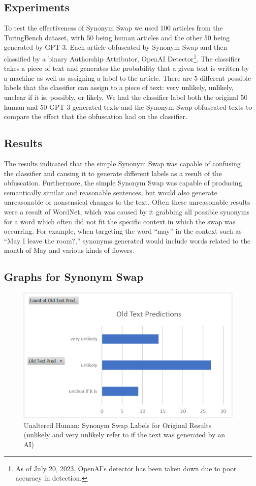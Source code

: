 \documentclass{article}
\begin{document}
\subsection{Experiments}
To test the effectiveness of Synonym Swap we used 100 articles from the TuringBench dataset, with 50 being human articles and the other 50 being generated by GPT-3. Each article obfuscated by Synonym Swap and then classified by a binary Authorship Attributor, OpenAI Detector\footnote{As of July 20, 2023, OpenAI's detector has been taken down due to poor accuracy in detection.}. The classifier takes a piece of text and generates the probability that a given text is written by a machine as well as assigning a label to the article. There are 5 different possible labels that the classifier can assign to a piece of text: very unlikely, unlikely, unclear if it is, possibly, or likely.
We had the classifier label both the original 50 human and 50 GPT-3 generated texts and the Synonym Swap obfuscated texts to compare the effect that the obfuscation had on the classifier.
\subsection{Results}
The results indicated that the simple Synonym Swap was capable of confusing the classifier and causing it to generate different labels as a result of the obfuscation.
Furthermore, the simple Synonym Swap was capable of producing semantically similar and reasonable sentences, but would also generate unreasonable or nonsensical changes to the text. Often these unreasonable results were a result of WordNet, which was caused by it grabbing all possible synonyms for a word which often did not fit the specific context in which the swap was occurring. For example, when targeting the word “may” in the context such as “May I leave the room?,” synonyms generated would include words related to the month of May and various kinds of flowers.

\subsection{Graphs for Synonym Swap}
\begin{figure}[H]
    \centering
    \includegraphics[width=.75\linewidth]{UnalteredHuman.png}
    \caption{Unaltered Human: Synonym Swap Labels for Original Results (unlikely and very unlikely refer to if the text was generated by an AI)}
    \label{fig:enter-label}
\end{figure}
\end{document}
